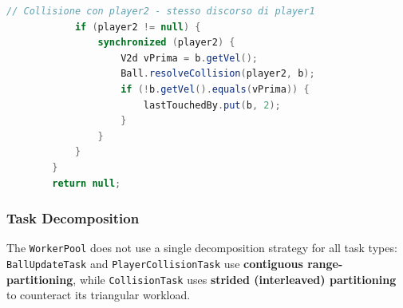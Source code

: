 \documentclass[12pt,a4paper]{article}
\begin{document}
\begin{itemize}
\begin{lstlisting}[language=Java, caption=Per-Player Lock Acquisition in PlayerCollisionTask]
            // Collisione con player2 - stesso discorso di player1
            if (player2 != null) {
                synchronized (player2) {
                    V2d vPrima = b.getVel();
                    Ball.resolveCollision(player2, b);
                    if (!b.getVel().equals(vPrima)) {
                        lastTouchedBy.put(b, 2);
                    }
                }
            }
        }
        return null;
    \end{lstlisting}

\end{itemize}
 
\subsubsection*{Task Decomposition}
The \texttt{WorkerPool} does not use a single decomposition strategy for all
task types: \texttt{BallUpdateTask} and \texttt{PlayerCollisionTask} use
\textbf{contiguous range-partitioning}, while \texttt{CollisionTask} uses
\textbf{strided (interleaved) partitioning} to counteract its triangular
workload.
\end{document}

